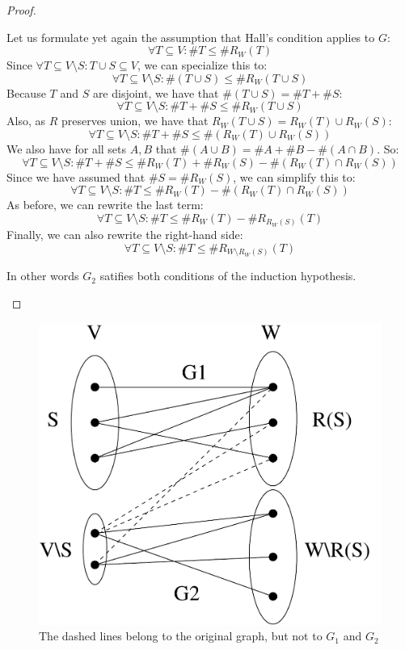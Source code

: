 \begin{proof}
\begin{itemize}
\begin{itemize}
\begin{itemize}
\begin{itemize}
Let us formulate yet again the assumption that Hall's condition applies to $G$:
\[ \forall T \subseteq V: \#T \leq \#R_W(T) \]
Since $\forall T \subseteq V\setminus S: T \cup S \subseteq V$, we can specialize this to:
\[ \forall T \subseteq V \setminus S: \#(T \cup S) \leq \#R_W(T \cup S) \]
Because $T$ and $S$ are disjoint, we have that $\#(T \cup S) = \#T + \#S$:
\[ \forall T \subseteq V \setminus S: \#T + \#S \leq \#R_W(T \cup S) \]
Also, as $R$ preserves union, we have that $R_W(T \cup S) = R_W(T) \cup R_W(S)$:
\[ \forall T \subseteq V \setminus S: \#T + \#S \leq \#(R_W(T) \cup R_W(S)) \]
We also have for all sets $A, B$ that $\#(A \cup B) = \#A + \#B - \#(A \cap B)$.
So:
\[ \forall T \subseteq V \setminus S: \#T + \#S \leq \#R_W(T) + \#R_W(S) - \#(R_W(T) \cap R_W(S)) \]
Since we have assumed that $\#S = \#R_W(S)$, we can simplify this to:
\[ \forall T \subseteq V \setminus S: \#T \leq \#R_W(T) - \#(R_W(T) \cap R_W(S)) \]
As before, we can rewrite the last term:
\[ \forall T \subseteq V \setminus S: \#T \leq \#R_W(T) - \#R_{R_W(S)}(T) \]
Finally, we can also rewrite the right-hand side:
\[ \forall T \subseteq V \setminus S: \#T \leq \#R_{W \setminus R_W(S)}(T) \]

In other words $G_2$ satifies both conditions of
the induction hypothesis.

\end{itemize}
\end{itemize}
\end{itemize}

\end{itemize}
\end{proof}

\begin{figure}[h]
\begin{center}
\includegraphics[height=0.35\textheight,keepaspectratio]{hall}
\caption{The dashed lines belong to the original graph, but not to $G_1$ and $G_2$}\label{hallfig}
\end{center}
\end{figure}

